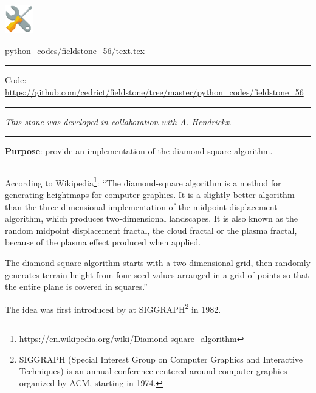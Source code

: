 \noindent
\includegraphics[height=1.25cm]{images/pictograms/tools}


\begin{flushright} {\tiny {\color{gray} python\_codes/fieldstone\_56/text.tex}} \end{flushright}


\par\noindent\rule{\textwidth}{0.4pt}

\begin{center}
\inpython
{\small Code: \url{https://github.com/cedrict/fieldstone/tree/master/python_codes/fieldstone_56}}
\end{center}

\par\noindent\rule{\textwidth}{0.4pt}

{\sl This stone was developed in collaboration with A. Hendrickx}. 

\par\noindent\rule{\textwidth}{0.4pt}

{\bf \color{teal} Purpose}: provide an implementation of the diamond-square algorithm.

\par\noindent\rule{\textwidth}{0.4pt}


According to Wikipedia\footnote{\url{https://en.wikipedia.org/wiki/Diamond-square_algorithm}}:
``The diamond-square algorithm is a method for generating heightmaps for computer graphics. It is a slightly better algorithm than the three-dimensional implementation of the midpoint displacement algorithm, which produces two-dimensional landscapes. It is also known as the random midpoint displacement fractal, the cloud fractal or the plasma fractal, because of the plasma effect produced when applied. 

The diamond-square algorithm starts with a two-dimensional grid, then randomly generates terrain height from four seed values arranged in a grid of points so that the entire plane is covered in squares.''

The idea was first introduced by \textcite{fofc82} at SIGGRAPH\footnote{
SIGGRAPH (Special Interest Group on Computer Graphics and Interactive Techniques) is an annual conference centered around computer graphics organized by ACM, starting in 1974.} in 1982.


